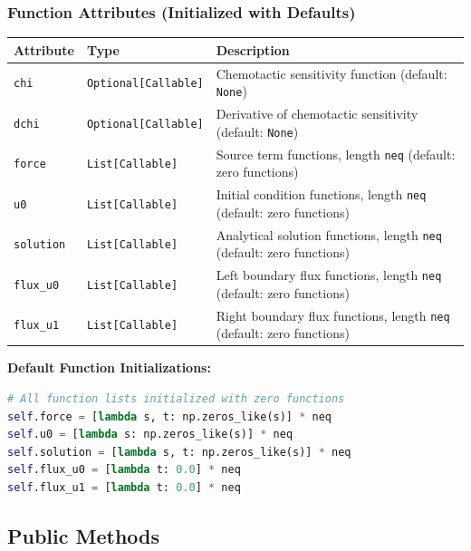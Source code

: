 \subsubsection{Function Attributes (Initialized with Defaults)}

\begin{longtable}{|p{2.5cm}|p{4cm}|p{7cm}|}
\hline
\textbf{Attribute} & \textbf{Type} & \textbf{Description} \\
\hline
\endhead

\texttt{chi} & \texttt{Optional[Callable]} & Chemotactic sensitivity function (default: \texttt{None}) \\
\hline

\texttt{dchi} & \texttt{Optional[Callable]} & Derivative of chemotactic sensitivity (default: \texttt{None}) \\
\hline

\texttt{force} & \texttt{List[Callable]} & Source term functions, length \texttt{neq} (default: zero functions) \\
\hline

\texttt{u0} & \texttt{List[Callable]} & Initial condition functions, length \texttt{neq} (default: zero functions) \\
\hline

\texttt{solution} & \texttt{List[Callable]} & Analytical solution functions, length \texttt{neq} (default: zero functions) \\
\hline

\texttt{flux\_u0} & \texttt{List[Callable]} & Left boundary flux functions, length \texttt{neq} (default: zero functions) \\
\hline

\texttt{flux\_u1} & \texttt{List[Callable]} & Right boundary flux functions, length \texttt{neq} (default: zero functions) \\
\hline

\end{longtable}

\textbf{Default Function Initializations:}
\begin{lstlisting}[language=Python, caption=Default Function Initializations]
# All function lists initialized with zero functions
self.force = [lambda s, t: np.zeros_like(s)] * neq
self.u0 = [lambda s: np.zeros_like(s)] * neq  
self.solution = [lambda s, t: np.zeros_like(s)] * neq
self.flux_u0 = [lambda t: 0.0] * neq
self.flux_u1 = [lambda t: 0.0] * neq
\end{lstlisting}

\subsection{Public Methods}
\label{subsec:public_methods}

